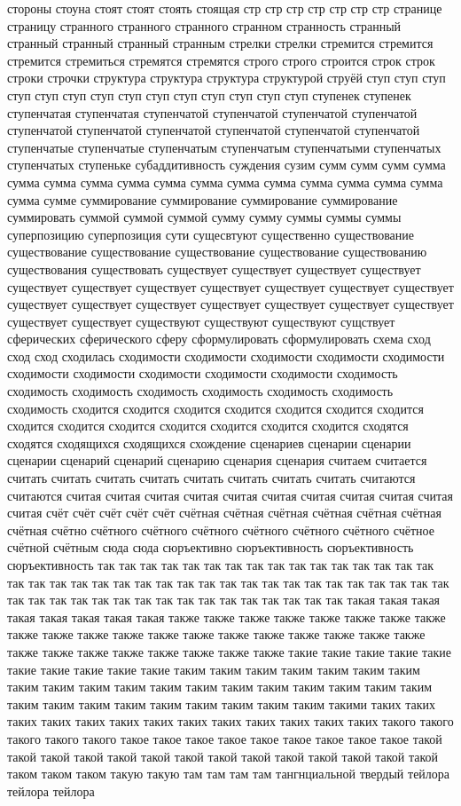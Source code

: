 стороны стоуна стоят стоят стоять стоящая стр стр стр стр стр стр стр странице страницу странного странного странного странном странность странный странный странный странный странным стрелки стрелки стремится стремится стремится стремиться стремятся стремятся строго строго строится строк строк строки строчки структура структура структура структурой струёй ступ ступ ступ ступ ступ ступ ступ ступ ступ ступ ступ ступ ступ ступ ступенек ступенек ступенчатая ступенчатая ступенчатой ступенчатой ступенчатой ступенчатой ступенчатой ступенчатой ступенчатой ступенчатой ступенчатой ступенчатой ступенчатые ступенчатые ступенчатым ступенчатым ступенчатыми ступенчатых ступенчатых ступеньке субаддитивность суждения сузим сумм сумм сумм сумма сумма сумма сумма сумма сумма сумма сумма сумма сумма сумма сумма сумма сумма сумме суммирование суммирование суммирование суммирование суммировать суммой суммой суммой сумму сумму суммы суммы суммы суперпозицию суперпозиция сути сущесвтуют существенно существование существование существование существование существование существованию существования существовать существует существует существует существует существует существует существует существует существует существует существует существует существует существует существует существует существует существует существует существует существуют существуют существуют сущствует сферических сферического сферу сформулировать сформулировать схема сход сход сход сходилась сходимости сходимости сходимости сходимости сходимости сходимости сходимости сходимости сходимости сходимости сходимость сходимость сходимость сходимость сходимость сходимость сходимость сходимость сходится сходится сходится сходится сходится сходится сходится сходится сходится сходится сходится сходится сходится сходится сходятся сходятся сходящихся сходящихся схождение сценариев сценарии сценарии сценарии сценарий сценарий сценарию сценария сценария считаем считается считать считать считать считать считать считать считать считать считаются считаются считая считая считая считая считая считая считая считая считая считая считая счёт счёт счёт счёт счёт счётная счётная счётная счётная счётная счётная счётная счётно счётного счётного счётного счётного счётного счётного счётное счётной счётным сюда сюда сюръективно сюръективность сюръективность сюръективность так так так так так так так так так так так так так так так так так так так так так так так так так так так так так так так так так так так так так так так так так так так так так так так так так так так так так такая такая такая такая такая такая такая такая также также также также также также также также также также также также также также также также также также также также также также также также также также также также такие такие такие такие такие такие такие такие такие такие таким таким таким таким таким таким таким таким таким таким таким таким таким таким таким таким таким таким таким таким таким таким таким таким таким таким таким таким такими таких таких таких таких таких таких таких таких таких таких таких таких таких такого такого такого такого такого такое такое такое такое такое такое такое такое такое такой такой такой такой такой такой такой такой такой такой такой такой такой такой таком таком таком такую такую там там там там тангнциальной твердый тейлора тейлора тейлора 